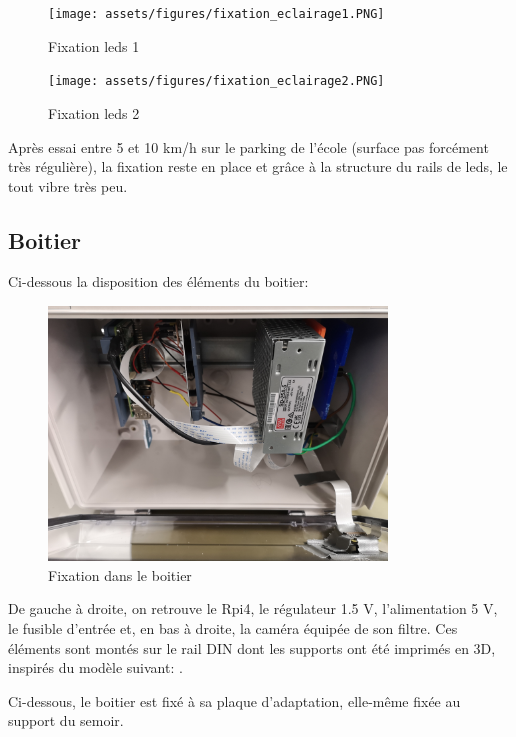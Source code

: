 \begin{figure}[H]
    \centering
    \texttt{[image: assets/figures/fixation\_eclairage1.PNG]}
    \caption{Fixation leds 1}
\end{figure}

\begin{figure}[H]
    \centering
    \texttt{[image: assets/figures/fixation\_eclairage2.PNG]}
    \caption{Fixation leds 2}
\end{figure}

Après essai entre 5 et 10 km/h sur le parking de l'école (surface pas forcément très régulière), la fixation reste en place et grâce à la structure du rails de leds, le tout vibre très peu.
\newpage
\subsection{Boitier}
Ci-dessous la disposition des éléments du boitier:

\begin{figure}[H]
    \centering
    \includegraphics[width=9cm]{assets/figures/boitier_montage.jpg}
    \caption{Fixation dans le boitier}
\end{figure}

De gauche à droite, on retrouve le Rpi4, le régulateur 1.5 V, l'alimentation 5 V, le fusible d'entrée et,
en bas à droite, la caméra équipée de son filtre. Ces éléments sont montés sur le rail DIN dont les supports ont été imprimés
en 3D, inspirés du modèle suivant: \cite{support_Rpi_3D}.

Ci-dessous, le boitier est fixé à sa plaque d'adaptation, elle-même fixée au support du semoir.

